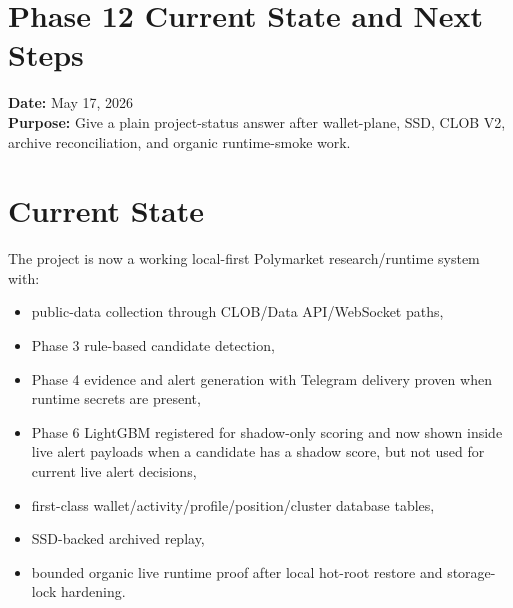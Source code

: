 \documentclass{article}
\begin{document}
\section*{Phase 12 Current State and Next Steps}

\textbf{Date:} May 17, 2026\\
\textbf{Purpose:} Give a plain project-status answer after wallet-plane, SSD, CLOB V2, archive reconciliation, and organic runtime-smoke work.

\section*{Current State}
The project is now a working local-first Polymarket research/runtime system with:
\begin{itemize}[nosep]
\item public-data collection through CLOB/Data API/WebSocket paths,
\item Phase 3 rule-based candidate detection,
\item Phase 4 evidence and alert generation with Telegram delivery proven when runtime secrets are present,
\item Phase 6 LightGBM registered for shadow-only scoring and now shown inside live alert payloads when a candidate has a shadow score, but not used for current live alert decisions,
\item first-class wallet/activity/profile/position/cluster database tables,
\item SSD-backed archived replay,
\item bounded organic live runtime proof after local hot-root restore and storage-lock hardening.
\end{itemize}
\end{document}
